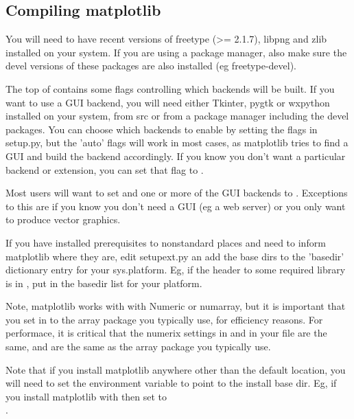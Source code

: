 \documentclass[twoside]{book}
\begin{document}
\subsection{Compiling matplotlib}
\label{sec:compilng}

You will need to have recent versions of freetype (>= 2.1.7), libpng
and zlib installed on your system.  If you are using a package
manager, also make sure the devel versions of these packages are also
installed (eg freetype-devel).
  
The top of  contains some flags controlling which
backends will be built.  If you want to use a GUI backend, you will
need either Tkinter, pygtk or wxpython installed on your system, from
src or from a package manager including the devel packages.  You can
choose which backends to enable by setting the flags in setup.py, but
the 'auto' flags will work in most cases, as matplotlib tries to find
a GUI and build the backend accordingly.  If you know you don't want a
particular backend or extension, you can set that flag to .
  
Most users will want to set  and one or more of
the GUI backends to .  Exceptions to this are if you know
you don't need a GUI (eg a web server) or you only want to produce
vector graphics.
  
If you have installed prerequisites to nonstandard places and need to
inform matplotlib where they are, edit setupext.py an add the base
dirs to the 'basedir' dictionary entry for your sys.platform.  Eg, if
the header to some required library is in
, put  in the
basedir list for your platform.
  
Note, matplotlib works with with Numeric or numarray, but it is
important that you set  in  to the array
package you typically use, for efficiency reasons.  For performace, it
is critical that the numerix settings in  and in your
 file are the same, and are the same as the array
package you typically use.
  
Note that if you install matplotlib anywhere other than the default
location, you will need to set the  environment
variable to point to the install base dir.  Eg, if you install
matplotlib with 
then set  to\\
.
 
\end{document}
